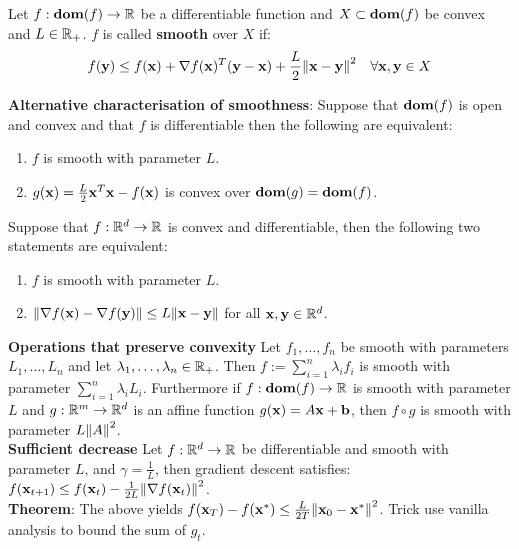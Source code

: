 \begin{framed}
    Let $f : \textbf{dom}(f) \rightarrow \mathbb{R}$ be a differentiable function and $X \subset \textbf{dom}(f)$ be convex and $L \in \mathbb{R}_{+}$. $f$ is called \textbf{smooth} over $X$ if: 
    \begin{align*}
         f(\mathbf{y}) \leq f(\mathbf{x}) + \nabla f(\mathbf{x})^T (\mathbf{y} - \mathbf{x}) + \frac{L}{2}\norm{\mathbf{x} - \mathbf{y}}^2 && \forall \mathbf{x}, \mathbf{y} \in X
    \end{align*}
\end{framed}
\textbf{Alternative characterisation of smoothness}: Suppose that $\textbf{dom}(f)$ is open and convex and that $f$ is differentiable then the following are equivalent:
\begin{enumerate}[label=(\roman*), topsep=0pt,itemsep=0ex,partopsep=0ex,parsep=0ex]
    \itemsep0em
    \item $f$ is smooth with parameter $L$.
    \item $g(\mathbf{x}) = \frac{L}{2} \mathbf{x}^T \mathbf{x} - f(\mathbf{x})$ is convex over $\textbf{dom}(g) = \textbf{dom}(f)$.
\end{enumerate}
Suppose that $f : \mathbb{R}^d \rightarrow \mathbb{R}$ is convex and differentiable, then the following two statements are equivalent:
\begin{enumerate}[label=(\roman*), topsep=0pt,itemsep=0ex,partopsep=0ex,parsep=0ex]    
    \itemsep0em
    \item $f$ is smooth with parameter $L$.
    \item $\norm{\nabla f(\mathbf{x}) - \nabla f(\mathbf{y})} \leq L \norm{\mathbf{x} -\mathbf{y}}$ for all $\mathbf{x}, \mathbf{y} \in \mathbb{R}^d$.
\end{enumerate}
\textbf{Operations that preserve convexity} Let $f_1, \dots, f_n$ be smooth with parameters $L_1, \dots, L_n$ and let $\lambda_1, \dots, \lambda_n \in \mathbb{R}_{+}$. Then $f := \sum_{i=1}^n{\lambda_i f_i}$ is smooth with parameter $\sum_{i=1}^n{\lambda_i L_i}$. Furthermore if $f : \textbf{dom}(f) \rightarrow \mathbb{R}$ is smooth with parameter $L$ and $g : \mathbb{R}^m \rightarrow \mathbb{R}^d$ is an affine function $g(\mathbf{x}) = A\mathbf{x} +\mathbf{b}$, then $f \circ g$ is smooth with parameter $L \norm{A}^2$. \\
\textbf{Sufficient decrease} Let $f : \mathbb{R}^d \rightarrow \mathbb{R}$ be differentiable and smooth with parameter $L$, and $\gamma = \frac{1}{L}$, then gradient descent satisfies: $f(\mathbf{x}_{t+1}) \leq f(\mathbf{x}_t) - \frac{1}{2L}\norm{\nabla f(\mathbf{x}_t)}^2$. \\
\textbf{Theorem}: The above yields $f(\mathbf{x}_T) - f(\mathbf{x}^*) \leq \frac{L}{2T}\norm{\mathbf{x}_0 - \mathbf{x}^*}^2$. Trick use vanilla analysis to bound the sum of $g_t$. \\
